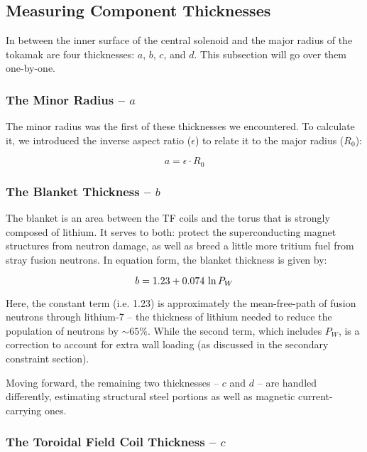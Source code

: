 \subsection{Measuring Component Thicknesses}
 
In between the inner surface of the central solenoid and the major radius of the tokamak are four thicknesses: $a$, $b$, $c$, and $d$. This subsection will go over them one-by-one.
 
\subsubsection{The Minor Radius -- $a$}

The minor radius was the first of these thicknesses we encountered. To calculate it, we introduced the inverse aspect ratio ($\epsilon$) to relate it to the major radius ($R_0$):

\begin{equation}
	\label{eq:aa}
	a = \epsilon \cdot R_0
\end{equation}
 
\subsubsection{The Blanket Thickness -- $b$}

The blanket is an area between the TF coils and the torus that is strongly composed of lithium. It serves to both: protect the superconducting magnet structures from neutron damage, as well as breed a little more tritium fuel from stray fusion neutrons. In equation form, the blanket thickness is given by:

\begin{equation}
	\label{eq:bb}
	b = 1.23 + 0.074 \ \textnormal{ln} \, P_W
\end{equation}

Here, the constant term (i.e. 1.23) is approximately the mean-free-path of fusion neutrons through lithium-7 -- the thickness of lithium needed to reduce the population of neutrons by $\sim 65\%$. While the second term, which includes $P_W$, is a correction to account for extra wall loading (as discussed in the secondary constraint section). 

Moving forward, the remaining two thicknesses -- $c$ and $d$ -- are handled differently, estimating structural steel portions as well as magnetic current-carrying ones.

\subsubsection{The Toroidal Field Coil Thickness -- $c$}

